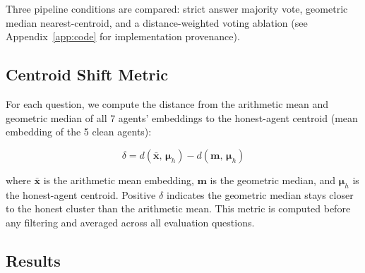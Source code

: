\documentclass[11pt]{article}
\begin{document}
Three pipeline conditions are compared: strict answer majority vote,
geometric median nearest-centroid, and a distance-weighted voting ablation
(see Appendix~\ref{app:code} for implementation provenance).

\subsection{Centroid Shift Metric}
\label{sec:centroid-shift}

For each question, we compute the distance from the arithmetic mean and geometric
median of all 7 agents' embeddings to the honest-agent centroid (mean embedding
of the 5 clean agents):

\begin{equation}
\delta = d(\bar{\mathbf{x}},\,\boldsymbol{\mu}_h)
       - d(\mathbf{m},\,\boldsymbol{\mu}_h)
\label{eq:centroid-shift}
\end{equation}

where $\bar{\mathbf{x}}$ is the arithmetic mean embedding, $\mathbf{m}$ is the
geometric median, and $\boldsymbol{\mu}_h$ is the honest-agent centroid. Positive
$\delta$ indicates the geometric median stays closer to the honest cluster than
the arithmetic mean. This metric is computed before any filtering and averaged
across all evaluation questions.

\subsection{Results}
\label{sec:exp3-results}
\end{document}
